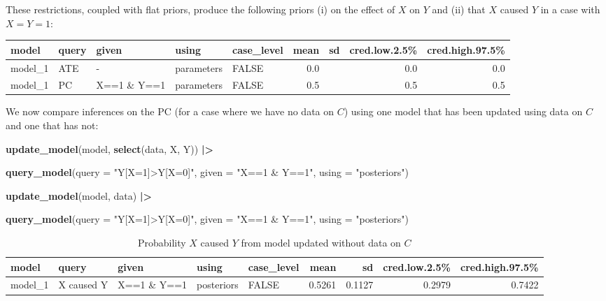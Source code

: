 \documentclass[
  12pt,
]{book}
\newenvironment{Shaded}{\begin{snugshade}}{\end{snugshade}}
\newcommand{\AttributeTok}[1]{\textcolor[rgb]{0.13,0.29,0.53}{#1}}
\newcommand{\FunctionTok}[1]{\textcolor[rgb]{0.13,0.29,0.53}{\textbf{#1}}}
\newcommand{\NormalTok}[1]{#1}
\newcommand{\SpecialCharTok}[1]{\textcolor[rgb]{0.81,0.36,0.00}{\textbf{#1}}}
\newcommand{\StringTok}[1]{\textcolor[rgb]{0.31,0.60,0.02}{#1}}
\begin{document}
These restrictions, coupled with flat priors, produce the following priors (i) on the effect of \(X\) on \(Y\) and (ii) that \(X\) caused \(Y\) in a case with \(X=Y=1\):

\begin{tabular}{l|l|l|l|l|r|r|r|r}
\hline
model & query & given & using & case\_level & mean & sd & cred.low.2.5\% & cred.high.97.5\%\\
\hline
model\_1 & ATE & - & parameters & FALSE & 0.0 &  & 0.0 & 0.0\\
\hline
model\_1 & PC & X==1 \& Y==1 & parameters & FALSE & 0.5 &  & 0.5 & 0.5\\
\hline
\end{tabular}

We now compare inferences on the PC (for a case where we have no data on \(C\)) using one model that has been updated using data on \(C\) and one that has not:

\begin{Shaded}
\begin{Highlighting}[]
\FunctionTok{update\_model}\NormalTok{(model, }\FunctionTok{select}\NormalTok{(data, X, Y)) }\SpecialCharTok{|\textgreater{}}
  
  \FunctionTok{query\_model}\NormalTok{(}\AttributeTok{query =} \StringTok{"Y[X=1]\textgreater{}Y[X=0]"}\NormalTok{, }\AttributeTok{given =} \StringTok{"X==1 \& Y==1"}\NormalTok{,}
              \AttributeTok{using =} \StringTok{"posteriors"}\NormalTok{) }

\FunctionTok{update\_model}\NormalTok{(model, data) }\SpecialCharTok{|\textgreater{}}

    \FunctionTok{query\_model}\NormalTok{(}\AttributeTok{query =} \StringTok{"Y[X=1]\textgreater{}Y[X=0]"}\NormalTok{, }\AttributeTok{given =} \StringTok{"X==1 \& Y==1"}\NormalTok{, }
              \AttributeTok{using =} \StringTok{"posteriors"}\NormalTok{) }
\end{Highlighting}
\end{Shaded}

\begin{table}

\caption{\label{tab:unnamed-chunk-81}Probability $X$ caused $Y$ from model updated without data on $C$}
\centering
\begin{tabular}[t]{l|l|l|l|l|r|r|r|r}
\hline
model & query & given & using & case\_level & mean & sd & cred.low.2.5\% & cred.high.97.5\%\\
\hline
model\_1 & X caused Y & X==1 \& Y==1 & posteriors & FALSE & 0.5261 & 0.1127 & 0.2979 & 0.7422\\
\hline
\end{tabular}
\end{table}
\end{document}
